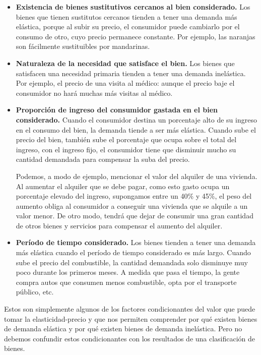 \documentclass[12pt,a4paper]{article}
\begin{document}
\begin{itemize}
    \item \textbf{Existencia de bienes sustitutivos cercanos al bien considerado.} Los bienes que tienen sustitutos cercanos tienden a tener una demanda más elástica, porque al subir su precio, el consumidor puede cambiarlo por el consumo de otro, cuyo precio permanece constante. Por ejemplo, las naranjas son fácilmente sustituibles por mandarinas.
    
    \item \textbf{Naturaleza de la necesidad que satisface el bien.} Los bienes que satisfacen una necesidad primaria tienden a tener una demanda inelástica. Por ejemplo, el precio de una visita al médico: aunque el precio baje el consumidor no hará muchas más visitas al médico.
    
    \item \textbf{Proporción de ingreso del consumidor gastada en el bien considerado.} Cuando el consumidor destina un porcentaje alto de su ingreso en el consumo del bien, la demanda tiende a ser más elástica. Cuando sube el precio del bien, también sube el porcentaje que ocupa sobre el total del ingreso, con el ingreso fijo, el consumidor tiene que disminuir mucho su cantidad demandada para compensar la suba del precio.
    
    Podemos, a modo de ejemplo, mencionar el valor del alquiler de una vivienda. Al aumentar el alquiler que se debe pagar, como esto gasto ocupa un porcentaje elevado del ingreso, supongamos entre un 40\% y 45\%, el peso del aumento obliga al consumidor a conseguir una vivienda que se alquile a un valor menor. De otro modo, tendrá que dejar de consumir una gran cantidad de otros bienes y servicios para compensar el aumento del alquiler.
    
    \item \textbf{Período de tiempo considerado.} Los bienes tienden a tener una demanda más elástica cuando el período de tiempo considerado es más largo. Cuando sube el precio del combustible, la cantidad demandada solo disminuye muy poco durante los primeros meses. A medida que pasa el tiempo, la gente compra autos que consumen menos combustible, opta por el transporte público, etc.
\end{itemize}

Estos son simplemente algunos de los factores condicionantes del valor que puede tomar la elasticidad-precio y que nos permiten comprender por qué existen bienes de demanda elástica y por qué existen bienes de demanda inelástica. Pero no debemos confundir estos condicionantes con los resultados de una clasificación de bienes.
\end{document}
